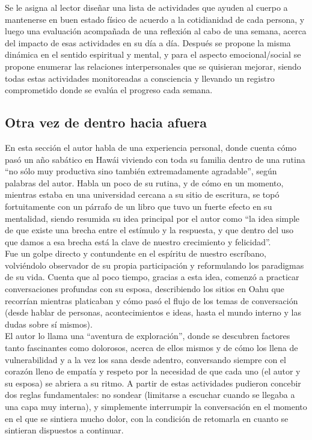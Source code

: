 \documentclass[onecolumn]{article} %
\begin{document}
	Se le asigna al lector diseñar una lista de actividades que ayuden al cuerpo a mantenerse en buen estado físico de acuerdo a la cotidianidad de cada persona, y luego una evaluación acompañada de una reflexión al cabo de una semana, acerca del impacto de esas actividades en su día a día. Después se propone la misma dinámica en el sentido espiritual y mental, y para el aspecto emocional/social se propone enumerar las relaciones interpersonales que se quisieran mejorar, siendo todas estas actividades monitoreadas a consciencia y llevando un registro comprometido donde se evalúa el progreso cada semana.
	
	\subsection{Otra vez de dentro hacia afuera}
	
	En esta sección el autor habla de una experiencia personal, donde cuenta cómo pasó un año sabático en Hawái viviendo con toda su familia dentro de una rutina ``no sólo muy productiva sino también extremadamente agradable'', según palabras del autor. Habla un poco de su rutina, y de cómo en un momento, mientras estaba en una universidad cercana a su sitio de escritura, se topó fortuitamente con un párrafo de un libro que tuvo un fuerte efecto en su mentalidad, siendo resumida su idea principal por el autor como ``la idea simple de que existe una brecha entre el estímulo y la respuesta, y que dentro del uso que damos a esa brecha está la clave de nuestro crecimiento y felicidad''.\\
	
	Fue un golpe directo y contundente en el espíritu de nuestro escríbano, volviéndolo observador de su propia participación y reformulando los paradigmas de su vida. Cuenta que al poco tiempo, gracias a esta idea, comenzó a practicar conversaciones profundas con su esposa, describiendo los sitios en Oahu que recorrían mientras platicaban y cómo pasó el flujo de los temas de conversación (desde hablar de personas, acontecimientos e ideas, hasta el mundo interno y las dudas sobre sí mismos).\\
	
	El autor lo llama una ``aventura de exploración'', donde se descubren factores tanto fascinantes como dolorosos, acerca de ellos mismos y de cómo los llena de vulnerabilidad y a la vez los sana desde adentro, conversando siempre con el corazón lleno de empatía y respeto por la necesidad de que cada uno (el autor y su esposa) se abriera a su ritmo. A partir de estas actividades pudieron concebir dos reglas fundamentales: no sondear (limitarse a escuchar cuando se llegaba a una capa muy interna), y simplemente interrumpir la conversación en el momento en el que se sintiera mucho dolor, con la condición de retomarla en cuanto se sintieran dispuestos a continuar.\\
	
\end{document}
